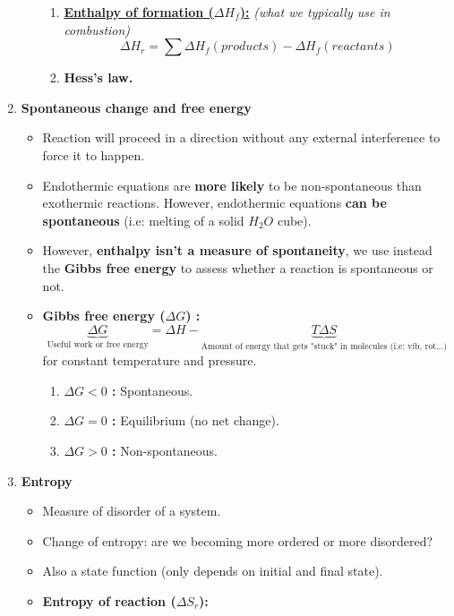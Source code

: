 \documentclass[a4paper,11pt]{article}
\begin{document}
\begin{enumerate}
\begin{itemize}
\begin{enumerate}
    \item \underline{\textbf{Enthalpy of formation ($\Delta H_f$):}} \emph{(what we typically use in combustion)}
    \[\Delta H_r = \sum \Delta H_f(products) - \Delta H_f(reactants)\]
    \item \textbf{Hess's law.}
\end{enumerate}

        \end{itemize}
    \item \textbf{Spontaneous change and free energy}
        \begin{itemize}
        \item Reaction will proceed in a direction without any external interference to force it to happen.
        \item Endothermic equations are \textbf{more likely} to be non-spontaneous than exothermic reactions. However, endothermic equations \textbf{can be spontaneous} (i.e: melting of a solid $H_2O$ cube).
        \item However, \textbf{enthalpy isn't a measure of spontaneity}, we use instead the \textbf{Gibbs free energy} to assess whether a reaction is spontaneous or not.
        \item \textbf{Gibbs free energy ($\Delta G$) :}
        \[\underbrace{\Delta G}_\textrm{Useful work or free energy} = \Delta H - \underbrace{T \Delta S}_\textrm{Amount of energy that gets "stuck" in molecules (i.e: vib, rot...)}\]
        for constant temperature and pressure.
            \begin{enumerate}
                \item \textbf{$\Delta G < 0$ :} Spontaneous.
                \item \textbf{$\Delta G = 0$ :} Equilibrium (no net change).
                \item \textbf{$\Delta G > 0$ :} Non-spontaneous.
            \end{enumerate}
        \end{itemize}
    \item \textbf{Entropy}
        \begin{itemize}
            \item Measure of disorder of a system.
            \item Change of entropy: are we becoming more ordered or more disordered?
            \item Also a state function (only depends on initial and final state).
            \item \textbf{Entropy of reaction ($\Delta S_r$):}

\end{itemize}
\end{enumerate}
\end{document}

